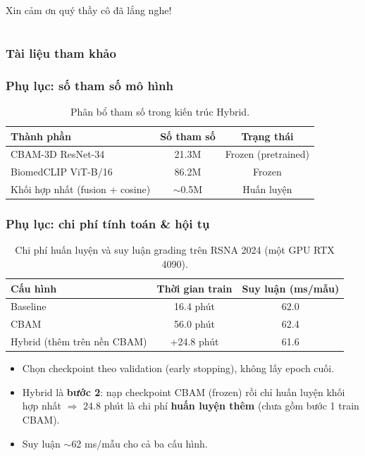 \documentclass{beamer}
\numberwithin{figure}{section}
\numberwithin{table}{section}
\begin{document}
\begin{frame}
\huge{\centerline{Xin cảm ơn quý thầy cô đã lắng nghe!}}
\end{frame}

\section{}
\begin{frame}[allowframebreaks]
\frametitle{Tài liệu tham khảo}
\printbibliography
\end{frame}

\appendix
\begin{frame}
\frametitle{Phụ lục: số tham số mô hình}
\begin{table}
\centering
\begin{tabular}{lcc}
\toprule
\textbf{Thành phần} & \textbf{Số tham số} & \textbf{Trạng thái} \\
\midrule
CBAM-3D ResNet-34 & 21.3M & Frozen (pretrained) \\
BiomedCLIP ViT-B/16 & 86.2M & Frozen \\
Khối hợp nhất (fusion + cosine) & $\sim$0.5M & Huấn luyện \\
\bottomrule
\end{tabular}
\caption{Phân bổ tham số trong kiến trúc Hybrid.}
\end{table}
\end{frame}

\begin{frame}
\frametitle{Phụ lục: chi phí tính toán \& hội tụ}
\begin{table}
\centering
\begin{tabular}{lcc}
\toprule
\textbf{Cấu hình} & \textbf{Thời gian train} & \textbf{Suy luận (ms/mẫu)} \\
\midrule
Baseline   & 16.4 phút & 62.0 \\
CBAM       & 56.0 phút & 62.4 \\
Hybrid (thêm trên nền CBAM) & +24.8 phút & 61.6 \\
\bottomrule
\end{tabular}
\caption{Chi phí huấn luyện và suy luận grading trên RSNA 2024 (một GPU RTX 4090).}
\end{table}
\begin{itemize}\footnotesize
    \item[--] Chọn checkpoint theo validation (early stopping), không lấy epoch cuối.
    \item[--] Hybrid là \textbf{bước 2}: nạp checkpoint CBAM (frozen) rồi chỉ huấn luyện khối hợp nhất $\Rightarrow$ 24.8 phút là chi phí \textbf{huấn luyện thêm} (chưa gồm bước 1 train CBAM).
    \item[--] Suy luận $\sim$62 ms/mẫu cho cả ba cấu hình.
\end{itemize}
\end{frame}
\end{document}
